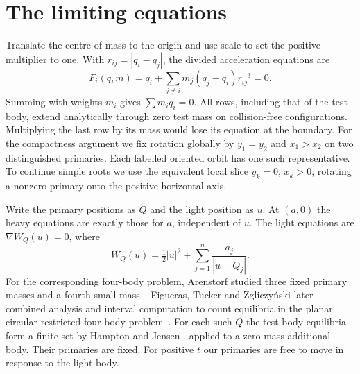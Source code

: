 \documentclass[11pt]{article}
\begin{document}
\section{The limiting equations}
Translate the centre of mass to the origin and use scale to set the positive multiplier to one. With $r_{ij}=|q_i-q_j|$, the divided acceleration equations are
\begin{equation}\label{normal}
 F_i(q,m)=q_i+\sum_{j\ne i}m_j(q_j-q_i)r_{ij}^{-3}=0 .
\end{equation}
Summing with weights $m_i$ gives $\sum m_iq_i=0$. All rows, including that of the test body, extend analytically through zero test mass on collision-free configurations. Multiplying the last row by its mass would lose its equation at the boundary. For the compactness argument we fix rotation globally by $y_1=y_2$ and $x_1>x_2$ on two distinguished primaries. Each labelled oriented orbit has one such representative. To continue simple roots we use the equivalent local slice $y_k=0$, $x_k>0$, rotating a nonzero primary onto the positive horizontal axis.

Write the primary positions as $Q$ and the light position as $u$. At $(a,0)$ the heavy equations are exactly those for $a$, independent of $u$. The light equations are $\nabla W_Q(u)=0$, where
\[
 W_Q(u)=\tfrac12 |u|^2+\sum_{j=1}^n \frac{a_j}{|u-Q_j|}.
\]
For the corresponding four-body problem, Arenstorf studied three fixed primary masses and a fourth small mass~\cite{arenstorf}. Figueras, Tucker and Zgliczyński later combined analysis and interval computation to count equilibria in the planar circular restricted four-body problem~\cite{ftz}. For each such $Q$ the test-body equilibria form a finite set by Hampton and Jensen \cite[Theorem 3.1]{hj}, applied to a zero-mass additional body. Their primaries are fixed. For positive $t$ our primaries are free to move in response to the light body.
\end{document}
